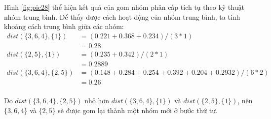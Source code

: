 Hình \ref{fig:pic28} thể hiện kết quả của gom nhóm phân cấp tích tụ theo kỹ thuật nhóm trung bình.
Để thấy được cách hoạt động của nhóm trung bình, ta tính khoảng cách trung bình giữa các nhóm:
\begin{equation}
\begin{aligned}
dist(\{3, 6, 4\}, \{1\})
&= (0.221 + 0.368 + 0.234) / (3 * 1)	\\ 
&= 0.28									\\
dist(\{2, 5\}, \{1\})
&= (0.235 + 0.342) / (2 * 1)			\\
&= 0.2889								\\
dist(\{3, 6, 4\}, \{2, 5\})				
&= (0.148 + 0.284 + 0.254 + 0.392 + 0.204 + 0.2932) /  (6 * 2)	\\
&= 0.26									\\
\end{aligned}
\end{equation}

Do $dist(\{3, 6, 4\}, \{2, 5\})$ nhỏ hơn $dist(\{3, 6, 4\}, \{1\})$ và $dist(\{2, 5\}, \{1\})$, nên $\{3, 6, 4\}$ và $\{2, 5\}$ sẽ được gom lại thành một nhóm mới ở bước thứ tư.


